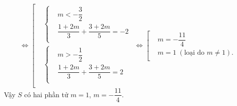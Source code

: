 \begin{ex}
{		\[\Leftrightarrow \left[ \begin{aligned}
			& \left\{ \begin{aligned}
				& m<-\dfrac{3}{2} \\
				& \dfrac{1+2m}{3}+\dfrac{3+2m}{5}=-2 \\
			\end{aligned} \right. \\
			& \left\{ \begin{aligned}
				& m>-\dfrac{1}{2} \\
				& \dfrac{1+2m}{3}+\dfrac{3+2m}{5}=2 \\
			\end{aligned} \right. \\
		\end{aligned} \right.\Leftrightarrow \left[ \begin{aligned}
			& m=-\dfrac{11}{4} \\
			& m=1 \; (\text{loại do }m\ne 1). \\
		\end{aligned} \right.\]
		Vậy $S$ có hai phần tử $m=1$, $m=-\dfrac{11}{4}$.\\
	}
\end{ex}

